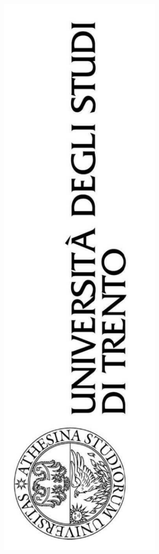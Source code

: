 \documentclass[12pt]{article}
\begin{document}
\begin{titlepage}
	\centering
	\begin{figure}[ht]
		\centering
		\includegraphics[angle=-90, keepaspectratio=true, width=8cm]{../images/logo}

\end{figure}
\end{titlepage}
\end{document}
